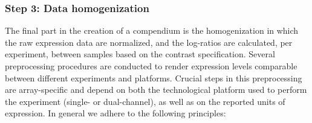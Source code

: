 \subsubsection{Step 3: Data homogenization}

The final part in the creation of a compendium is the homogenization in which
the raw expression data are normalized, and the log-ratios are calculated,
per experiment, between samples based on the contrast specification.
%
Several preprocessing procedures are conducted to render expression levels
comparable between different experiments and platforms.
%
Crucial steps in this preprocessing are array-specific and depend on both the
technological platform used to perform the experiment (single- or
dual-channel), as well as on the reported units of expression.
In general we adhere to the following principles: 
%
%
